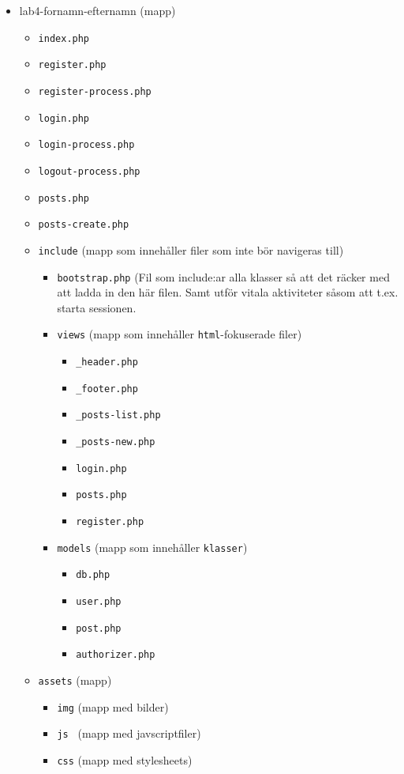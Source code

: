 \documentclass[12pt]{article}
\begin{document}
  \begin{itemize}
    \item lab4-fornamn-efternamn (mapp)
    \begin{itemize}
      \item \texttt{index.php}
      \item \texttt{register.php}
      \item \texttt{register-process.php}
      \item \texttt{login.php}
      \item \texttt{login-process.php}
      \item \texttt{logout-process.php}
      \item \texttt{posts.php}
      \item \texttt{posts-create.php}
      \item \texttt{include} (mapp som innehåller filer som inte bör navigeras till)
      \begin{itemize}
        \item \texttt{bootstrap.php} (Fil som include:ar alla klasser så att det räcker med att ladda in den här filen. Samt utför vitala aktiviteter såsom att t.ex. starta sessionen.
        \item \texttt{views} (mapp som innehåller \texttt{html}-fokuserade filer)
        \begin{itemize}
          \item \texttt{\_header.php}
          \item \texttt{\_footer.php}
          \item \texttt{\_posts-list.php}
          \item \texttt{\_posts-new.php}
          \item \texttt{login.php}
          \item \texttt{posts.php}
          \item \texttt{register.php}
        \end{itemize}
        \item \texttt{models} (mapp som innehåller \texttt{klasser})
        \begin{itemize}
          \item \texttt{db.php}
          \item \texttt{user.php}
          \item \texttt{post.php}
          \item \texttt{authorizer.php}
        \end{itemize}
      \end{itemize}
      \item \texttt{assets} (mapp)
      \begin{itemize}
        \item \texttt{img} (mapp med bilder)
        \item \texttt{js  } (mapp med javscriptfiler)
        \item \texttt{css} (mapp med stylesheets)
      \end{itemize}
    \end{itemize}
  \end{itemize}
\end{document}

